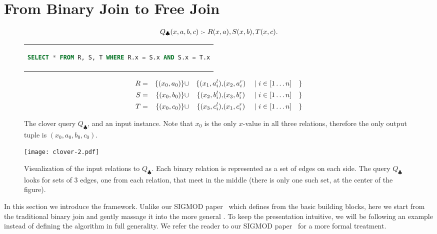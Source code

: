 \section{From Binary Join to Free Join}\label{sec:background}

\begin{figure}
  \begin{align*}
    Q_{\clubsuit}(x,a,b,c) \text{ :- } R(x,a),S(x,b),T(x,c).
  \end{align*}
  \begin{center}
    \begin{tabular}{c}
      \begin{lstlisting}[language=SQL, numbers=none]
SELECT * FROM R, S, T WHERE R.x = S.x AND S.x = T.x
\end{lstlisting}
    \end{tabular}
  \end{center}
  \begin{alignat*}{8}
    R & = & \{(x_0, a_0)\} & \cup & \{(x_1, a_i^l), & (x_2, a_i^r) &  & \mid i \in [1 \ldots n] & \} \\
    S & = & \{(x_0, b_0)\} & \cup & \{(x_2, b_i^l), & (x_3, b_i^r) &  & \mid i \in [1 \ldots n] & \} \\
    T & = & \{(x_0, c_0)\} & \cup & \{(x_3, c_i^l), & (x_1, c_i^r) &  & \mid i \in [1 \ldots n] & \}
  \end{alignat*}
  \caption{The clover query $Q_\clubsuit$, and an input instance.
    Note that $x_0$ is the only $x$-value in all three relations,
    therefore the only output tuple is $(x_0, a_0, b_0, c_0)$. }
  \label{fig:clover-query}
\end{figure}

\begin{figure}
  \texttt{[image: clover-2.pdf]}
  \caption{Visualization of the input relations to $Q_\clubsuit$.
    Each binary relation is represented as a set of edges on each side.
    The query $Q_\clubsuit$ looks for sets of 3 edges, one from each relation,
    that meet in the middle (there is only one such set, at the center of the figure).}
\end{figure}

In this section we introduce the \FJ framework.
Unlike our SIGMOD paper~\cite{10.1145/3589295} which defines \FJ from
the basic building blocks,
here we start from the traditional binary join
and gently massage it into the more general \FJ.
To keep the presentation intuitive,
we will be following an example instead of
defining the algorithm in full generality.
We refer the reader to our SIGMOD paper~\cite{10.1145/3589295}
for a more formal treatment.

